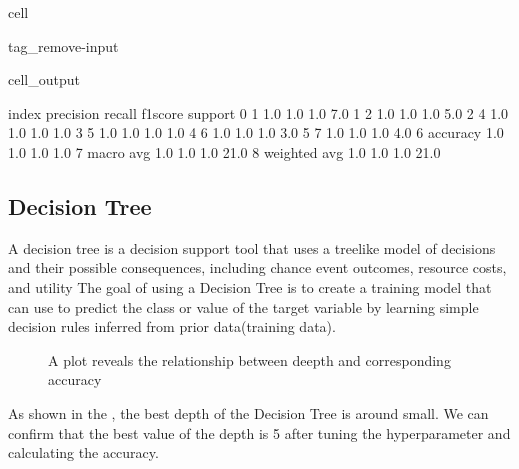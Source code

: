 \documentclass[letterpaper,10pt,english]{jupyterBook}
\let\sphinxpxdimen\pdfpxdimen\else\newdimen\sphinxpxdimen
\begin{document}
\begin{sphinxuseclass}{cell}
\begin{sphinxuseclass}{tag_remove-input}\begin{sphinxVerbatimOutput}

\begin{sphinxuseclass}{cell_output}
\begin{sphinxVerbatim}[commandchars=\\\{\}]
          index  precision  recall  f1\PYGZhy{}score  support
0             1        1.0     1.0       1.0      7.0
1             2        1.0     1.0       1.0      5.0
2             4        1.0     1.0       1.0      1.0
3             5        1.0     1.0       1.0      1.0
4             6        1.0     1.0       1.0      3.0
5             7        1.0     1.0       1.0      4.0
6      accuracy        1.0     1.0       1.0      1.0
7     macro avg        1.0     1.0       1.0     21.0
8  weighted avg        1.0     1.0       1.0     21.0
\end{sphinxVerbatim}

\end{sphinxuseclass}\end{sphinxVerbatimOutput}

\end{sphinxuseclass}
\end{sphinxuseclass}

\subsection{Decision Tree}
\label{\detokenize{analysis:decision-tree}}
\sphinxAtStartPar
A decision tree is a decision support tool that uses a tree\sphinxhyphen{}like model of decisions and their possible consequences, including chance event outcomes, resource costs, and utility The goal of using a Decision Tree is to create a training model that can use to predict the class or value of the target variable by learning simple decision rules inferred from prior data(training data).

\begin{figure}[htbp]
\centering
\capstart

\noindent\sphinxincludegraphics[width=500\sphinxpxdimen]{{dt_accuracy}.png}
\caption{A plot reveals the relationship between deepth and corresponding accuracy}\label{\detokenize{analysis:f3}}\end{figure}

\sphinxAtStartPar
As shown in the {\hyperref[\detokenize{analysis:f3}]{}}, the best depth of the Decision Tree is around small. We can confirm that the best value of the depth is 5 after tuning the hyperparameter and calculating the accuracy.
\end{document}
